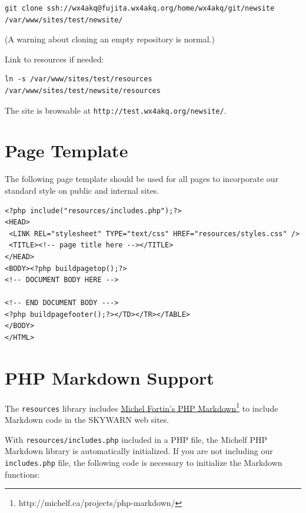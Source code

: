 \documentclass[pdflatex,letterpaper,twoside,12pt]{book}
\begin{document}
\begin{verbatim}
git clone ssh://wx4akq@fujita.wx4akq.org/home/wx4akq/git/newsite /var/www/sites/test/newsite/
\end{verbatim}

(A warning about cloning an empty repository is normal.)

Link to resources if needed:

\begin{verbatim}
ln -s /var/www/sites/test/resources /var/www/sites/test/newsite/resources
\end{verbatim}

The site is browsable at \texttt{http://test.wx4akq.org/newsite/}.


\section{Page Template}

The following page template should be used for all pages to incorporate our standard style on public and internal sites.
\pagebreak
\begin{verbatim}
<?php include("resources/includes.php");?>
<HEAD>
 <LINK REL="stylesheet" TYPE="text/css" HREF="resources/styles.css" />
 <TITLE><!-- page title here --></TITLE>
</HEAD>
<BODY><?php buildpagetop();?>
<!-- DOCUMENT BODY HERE -->

<!-- END DOCUMENT BODY --->
<?php buildpagefooter();?></TD></TR></TABLE>
</BODY>
</HTML>
\end{verbatim}


\section{PHP Markdown Support}

The \texttt{resources} library includes \href{http://michelf.ca/projects/php-markdown/}{Michel Fortin's PHP Markdown}\footnote{http://michelf.ca/projects/php-markdown/} to include Markdown code in the SKYWARN web sites.

With \texttt{resources/includes.php} included in a PHP file, the Michelf PHP Markdown library is automatically initialized.  If you are not including our \texttt{includes.php} file, the following code is necessary to initialize the Markdown functions:
\end{document}

